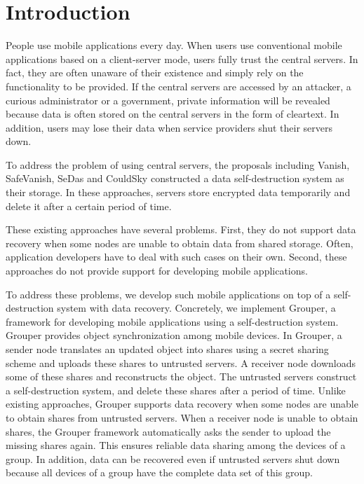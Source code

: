 \documentclass[a4paper,11pt]{report}
\begin{document}
\pagebreak \setcounter{page}{1}

\chapter{Introduction} \label{chapter:introduction}

People use mobile applications every day. 
When users use conventional mobile applications based on a client-server mode, users fully trust the central servers.
In fact, they are often unaware of their existence and simply rely on the functionality to be provided.
If the central servers are accessed by an attacker, a curious administrator or a government, private information will be revealed because data is often stored on the central servers in the form of cleartext.
In addition, users may lose their data when service providers shut their servers down.

To address the problem of using central servers, the proposals including Vanish\cite{geambasu2009vanish}, SafeVanish\cite{zeng2010safevanish}, SeDas\cite{zeng2012sedas} and CouldSky\cite{zeng2015cloudsky} constructed a data self-destruction system as their storage.
In these approaches, servers store encrypted data temporarily and delete it after a certain period of time.

These existing approaches have several problems.
First, they do not support data recovery when some nodes are unable to obtain data from shared storage.
Often, application developers have to deal with such cases on their own.
Second, these approaches do not provide support for developing mobile applications.

To address these problems, we develop such mobile applications on top of a self-destruction system with data recovery.
Concretely, we implement Grouper, a framework for developing mobile applications using a self-destruction system\cite{li2017grouper}. 
Grouper provides object synchronization among mobile devices.
In Grouper, a sender node translates an updated object into shares using a secret sharing scheme and uploads these shares to untrusted servers. 
A receiver node downloads some of these shares and reconstructs the object.
The untrusted servers construct a self-destruction system, and delete these shares after a period of time.
Unlike existing approaches, Grouper supports data recovery when some nodes are unable to obtain shares from untrusted servers.
When a receiver node is unable to obtain shares, the Grouper framework automatically asks the sender to upload the missing shares again.
This ensures reliable data sharing among the devices of a group.
In addition, data can be recovered even if untrusted servers shut down because all devices of a group have the complete data set of this group.
\end{document}
